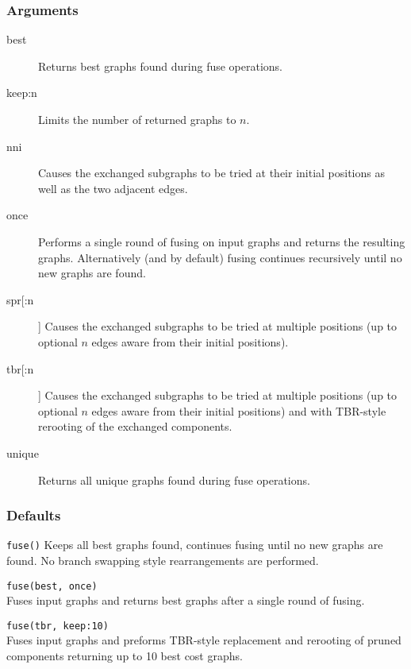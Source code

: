 	\subsubsection{Arguments}
	\begin{description}
		\item [best] Returns best graphs found during fuse operations.		
		
		\item [keep:n] Limits the number of returned graphs to $n$. 
		
		\item [nni] Causes the exchanged subgraphs to be tried at their initial positions as well as the 
		two adjacent edges.
		
		\item [once] Performs a single round of fusing on input graphs and returns the resulting graphs. 
		Alternatively (and by default) fusing continues recursively until no new graphs are found.
		
		\item [spr[:n]] Causes the exchanged subgraphs to be tried at multiple positions (up to optional 
		$n$ edges aware from their initial positions).
		
		\item [tbr[:n]] Causes the exchanged subgraphs to be tried at multiple positions (up to optional 
		$n$ edges aware from their initial positions) and with TBR-style rerooting of the exchanged components.
		
		\item [unique] Returns all unique graphs found during fuse operations.	
	\end{description}	
	
	\subsubsection{Defaults}
		\texttt{fuse()} Keeps all best graphs found, continues fusing until no new graphs are found. No branch 
		swapping style rearrangements are performed.
	
	\begin{example}
	
		\item{\texttt{fuse(best, once)}\\Fuses input graphs and returns best graphs after a single round of 
		fusing.}
		
		\item{\texttt{fuse(tbr, keep:10)} \\Fuses input graphs and preforms TBR-style replacement and 
		rerooting of pruned components returning up to 10 best cost graphs.}
		
	\end{example}

